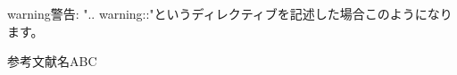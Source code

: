 \documentclass[letterpaper,10pt,dvipdfmx,openany,oneside]{sphinxmanual}
\begin{document}
\begin{sphinxadmonition}{warning}{警告:}
".. warning::"というディレクティブを記述した場合このようになります。
\end{sphinxadmonition}

\begin{sphinxthebibliography}{参考文献名ABC}
\end{sphinxthebibliography}



\renewcommand{\indexname}{索引}
\printindex
\end{document}
